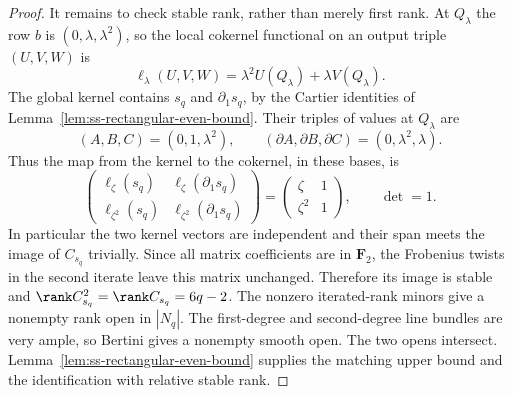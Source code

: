 \begin{proof}
It remains to check stable rank, rather than merely first rank.
At $Q_\lambda$ the row $b$ is $(0,\lambda,\lambda^2)$, so the local
cokernel functional on an output triple $(U,V,W)$ is
\[
              \ell_\lambda(U,V,W)
                   =\lambda^2 U(Q_\lambda)+\lambda V(Q_\lambda).
\]
The global kernel contains $s_q$ and $\partial_1s_q$, by the Cartier
identities of Lemma~\ref{lem:ss-rectangular-even-bound}.
Their triples of values at $Q_\lambda$ are
\[
              (A,B,C)=(0,1,\lambda^2),\qquad
              (\partial A,\partial B,\partial C)
                        =(0,\lambda^2,\lambda).
\]
Thus the map from the kernel to the cokernel, in these bases, is
\[
 \begin{pmatrix}
    \ell_\zeta(s_q)&\ell_\zeta(\partial_1s_q)\\
    \ell_{\zeta^2}(s_q)&\ell_{\zeta^2}(\partial_1s_q)
 \end{pmatrix}
       =\begin{pmatrix}\zeta&1\\\zeta^2&1\end{pmatrix},
 \qquad \det=1.
\]
In particular the two kernel vectors are independent and their span
meets the image of $C_{s_q}$ trivially.  Since all matrix coefficients
are in $\mathbf F_2$, the Frobenius twists in the second iterate leave
this matrix unchanged.  Therefore its image is stable and
$\rank C_{s_q}^2=\rank C_{s_q}=6q-2$.
The nonzero iterated-rank minors give a nonempty rank open in $|N_q|$.
The first-degree and second-degree line bundles are very ample, so
Bertini gives a nonempty smooth open.  The two opens intersect.
Lemma~\ref{lem:ss-rectangular-even-bound} supplies the matching upper
bound and the identification with relative stable rank.
\end{proof}

